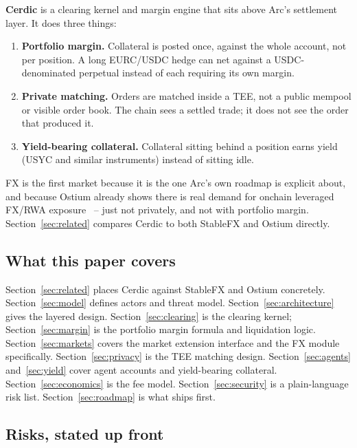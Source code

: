 \documentclass[11pt,a4paper]{article}
\begin{document}
\textbf{Cerdic} is a clearing kernel and margin engine that sits above Arc's settlement layer. It does three things:

\begin{enumerate}
  \item \textbf{Portfolio margin.} Collateral is posted once, against the whole account, not per position. A long EURC/USDC hedge can net against a USDC-denominated perpetual instead of each requiring its own margin.
  \item \textbf{Private matching.} Orders are matched inside a TEE, not a public mempool or visible order book. The chain sees a settled trade; it does not see the order that produced it.
  \item \textbf{Yield-bearing collateral.} Collateral sitting behind a position earns yield (USYC and similar instruments) instead of sitting idle.
\end{enumerate}

FX is the first market because it is the one Arc's own roadmap is explicit about, and because Ostium already shows there is real demand for onchain leveraged FX/RWA exposure~\cite{ostium} -- just not privately, and not with portfolio margin. Section~\ref{sec:related} compares Cerdic to both StableFX and Ostium directly.

\subsection{What this paper covers}

Section~\ref{sec:related} places Cerdic against StableFX and Ostium concretely. Section~\ref{sec:model} defines actors and threat model. Section~\ref{sec:architecture} gives the layered design. Section~\ref{sec:clearing} is the clearing kernel; Section~\ref{sec:margin} is the portfolio margin formula and liquidation logic. Section~\ref{sec:markets} covers the market extension interface and the FX module specifically. Section~\ref{sec:privacy} is the TEE matching design. Section~\ref{sec:agents} and~\ref{sec:yield} cover agent accounts and yield-bearing collateral. Section~\ref{sec:economics} is the fee model. Section~\ref{sec:security} is a plain-language risk list. Section~\ref{sec:roadmap} is what ships first.

\subsection{Risks, stated up front}
\end{document}
